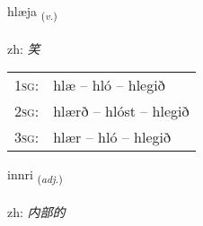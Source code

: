 \documentclass[frontgrid, backgrid]{flacards}\usepackage[]{graphicx}\usepackage[]{color}
\begin{document}
\renewcommand{\flhead}{\vskip5pt \fboxsep=0pt {\small\bfseries\footnotesize Sagnorð | 动词}}
\renewcommand{\fcfoot}{\vskip5pt \fboxsep=0pt \hspace{2pt}{\small\bfseries\footnotesize 2K}}

\renewcommand{\blhead}{\vskip5pt {\small\bfseries\footnotesize Sagnorð | 动词 }}
\renewcommand{\bcfoot}{\vskip5pt \hspace{2pt}{\small\bfseries\footnotesize 2K}}


{hlæja \small{\textsubscript{(\textit{v.})}} \\[1ex] %
\textphonetic{[l̥aiːja]} \\
zh: \emph{笑} \\  [2ex]
\renewcommand*{\arraystretch}{0.8}
\begin{tabular}{p{1cm}l}
\textsc{1sg}: & hlæ -- hló -- hlegið \\ 
\textsc{2sg}: & hlærð -- hlóst -- hlegið \\ 
\textsc{3sg}: & hlær -- hló -- hlegið \\ 
\end{tabular}
}

\renewcommand{\flhead}{\vskip5pt \fboxsep=0pt {\small\bfseries\footnotesize Lýsingarorð | 形容词}}
\renewcommand{\fcfoot}{\vskip5pt \fboxsep=0pt \hspace{2pt}{\small\bfseries\footnotesize 2K}}

\renewcommand{\blhead}{\vskip5pt {\small\bfseries\footnotesize Lýsingarorð | 形容词 }}
\renewcommand{\bcfoot}{\vskip5pt \hspace{2pt}{\small\bfseries\footnotesize 2K}}


{innri \small{\textsubscript{(\textit{adj.})}} \\[1ex] %
\textphonetic{[ɪnrɪ]} \\
zh: \emph{内部的} \\  [2ex]
\renewcommand*{\arraystretch}{0.8}
}
\end{document}
